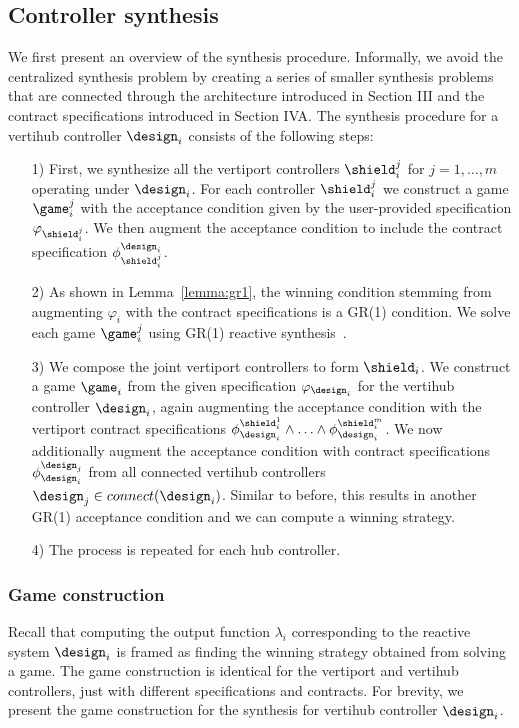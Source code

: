 \subsection{Controller synthesis}
We first present an overview of the synthesis procedure. Informally, we avoid the centralized synthesis problem by creating a series of smaller synthesis problems that are connected through the architecture introduced in Section III and the contract specifications introduced in Section IVA.
The synthesis procedure for a vertihub controller $\design_i$ consists of the following steps:
\begin{itemize}
 \item[1)] First, we synthesize all the vertiport controllers $\shield_i^j$ for $j=1,\ldots,m$ operating under $\design_i$. For each controller $\shield_i^j$ we construct a game $\game_{i}^j$ with the acceptance condition given by the user-provided specification $\varphi_{\shield_i^j}$. We then augment the acceptance condition to include the contract specification $\phi_{\shield_i^j}^{\design_i}$. 
  \item[2)] As shown in Lemma~\ref{lemma:gr1}, the winning condition stemming from augmenting $\varphi_i$ with the contract specifications is a GR(1) condition. We solve each game $\game_{i}^j$ using GR(1) reactive synthesis~\cite{bloem2012synthesis}. 
  \item[3)] We compose the joint vertiport controllers to form $\shield_i$. We construct a game $\game_{i}$ from the given specification $\varphi_{\design_i}$ for the vertihub controller $\design_i$, again augmenting the acceptance condition with the vertiport contract specifications $\phi^{\shield_i^1}_{\design_i} \wedge \ldots \wedge \phi^{\shield_i^m}_{\design_i}$. We now additionally augment the acceptance condition with contract specifications $\phi_{\design_i}^{\design_j}$ from all connected vertihub controllers $\design_j \in connect(\design_i)$. Similar to before, this results in another GR(1) acceptance condition and we can compute a winning strategy. 
\item[4)] The process is repeated for each hub controller.
\end{itemize}



\subsubsection*{\textbf{Game construction}}
Recall that computing the output function $\lambda_i$ corresponding to the reactive system $\design_i$ is framed as finding the winning strategy obtained from solving a game. The game construction is identical for the vertiport and vertihub controllers, just with different specifications and contracts. For brevity, we present the game construction for the synthesis for vertihub controller $\design_i$.

